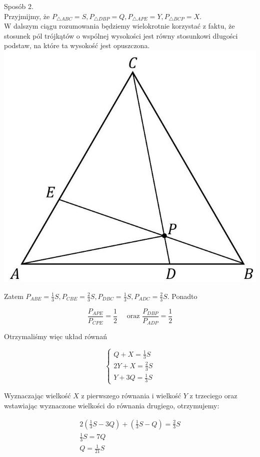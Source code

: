 \documentclass[10pt]{article}
\begin{document}
Sposób 2.\\
Przyjmijmy, że $P_{\triangle A B C}=S, P_{\triangle D B P}=Q, P_{\triangle A P E}=Y, P_{\triangle B C P}=X$.\\
W dalszym ciągu rozumowania będziemy wielokrotnie korzystać z faktu, że stosunek pól trójkątów o wspólnej wysokości jest równy stosunkowi długości podstaw, na które ta wysokość jest opuszczona.\\
\includegraphics[max width=\textwidth, center]{2025_02_07_36131546116d12814c9cg-12}

Zatem $P_{A B E}=\frac{1}{3} S, P_{C B E}=\frac{2}{3} S, P_{D B C}=\frac{1}{3} S, P_{A D C}=\frac{2}{3} S$. Ponadto

$$
\frac{P_{A P E}}{P_{C P E}}=\frac{1}{2} \quad \text { oraz } \frac{P_{D B P}}{P_{A D P}}=\frac{1}{2}
$$

Otrzymaliśmy więc układ równań

$$
\left\{\begin{array}{l}
Q+X=\frac{1}{3} S \\
2 Y+X=\frac{2}{3} S \\
Y+3 Q=\frac{1}{3} S
\end{array}\right.
$$

Wyznaczając wielkość $X$ z pierwszego równania i wielkość $Y$ z trzeciego oraz wstawiając wyznaczone wielkości do równania drugiego, otrzymujemy:

$$
\begin{gathered}
2\left(\frac{1}{3} S-3 Q\right)+\left(\frac{1}{3} S-Q\right)=\frac{2}{3} S \\
\frac{1}{3} S=7 Q \\
Q=\frac{1}{21} S
\end{gathered}
$$
\end{document}
